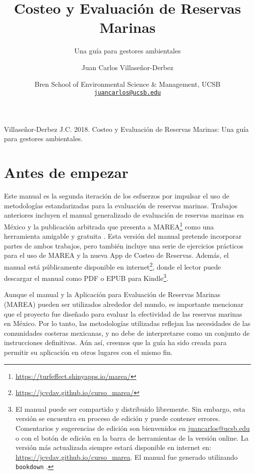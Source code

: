 \documentclass[]{krantz}
\title{Costeo y Evaluación de Reservas Marinas}
\subtitle{Una guía para gestores ambientales}
\author{Juan Carlos Villaseñor-Derbez}
\date{Bren School of Environmental Science \& Management, UCSB
\href{mailto:juancarlos@ucsb.edu}{\nolinkurl{juancarlos@ucsb.edu}}}
\renewcommand{\href}[2]{#2\footnote{\url{#1}}}
\begin{document}
\maketitle

\thispagestyle{empty}
\begin{center}
Villaseñor-Derbez J.C. 2018. Costeo y Evaluación de Reservas Marinas: Una guía para gestores ambientales.
\end{center}

\setlength{\abovedisplayskip}{-5pt}
\setlength{\abovedisplayshortskip}{-5pt}

{
\setcounter{tocdepth}{2}
\tableofcontents
}
\hypertarget{antes-de-empezar}{%
\chapter*{Antes de empezar}\label{antes-de-empezar}}


Este manual es la segunda iteración de los esfuerzos por impulsar el uso de metodologías estandarizadas para la evaluación de reservas marinas. Trabajos anteriores incluyen el manual generalizado de evaluación de reservas marinas en México \citep{villaseorderbez_2017} y la publicación arbitrada que presenta a \href{https://turfeffect.shinyapps.io/marea/}{MAREA} como una herramienta amigable y gratuita \citep{villasenorderbez_2018}. Esta versión del manual pretende incorporar partes de ambos trabajos, pero también incluye una serie de ejercicios prácticos para el uso de MAREA y la nueva App de Costeo de Reservas. Además, el manual está públicamente disponible en \href{https://jcvdav.github.io/curso_marea/}{internet}, donde el lector puede descargar el manual como PDF o EPUB para Kindle\footnote{El manual puede ser compartido y distribuido libremente. Sin embargo, esta versión se encuentra en proceso de edición y puede contener errores. Comentarios y sugerencias de edición son bienvenidos en \url{juancarlos@ucsb.edu} o con el botón de edición en la barra de herramientas de la versión online. La versión más actualizada siempre estará disponible en internet en: \url{https://jcvdav.github.io/curso_marea}. El manual fue generado utilizando \texttt{bookdown} \citep{R-bookdown}.}.

Aunque el manual y la Aplicación para Evaluación de Reservas Marinas (MAREA) pueden ser utilizados alrededor del mundo, es importante mencionar que el proyecto fue diseñado para evaluar la efectividad de las reservas marinas en México. Por lo tanto, las metodologías utilizadas reflejan las necesidades de las comunidades costeras mexicanas, y no debe de interpretarse como un conjunto de instrucciones definitivas. Aún así, creemos que la guía ha sido creada para permitir su aplicación en otros lugares con el mismo fin.
\end{document}
